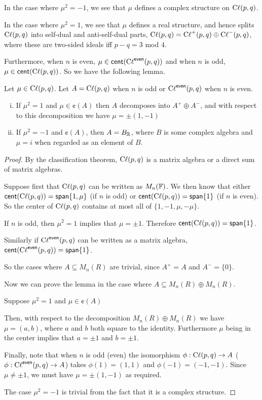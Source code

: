 In the case where $\mu^2=-1$, we see that $\mu$ defines a complex structure on $\operatorname{C\ell}(p,q)$.

In the case where $\mu^2 = 1$, we see that $\mu$ defines a real structure, and hence splits $\operatorname{C\ell}(p,q)$ into self-dual and anti-self-dual parts, $\operatorname{C\ell}(p,q) = \operatorname{C\ell}^+(p,q)\oplus \operatorname{C\ell}^-(p,q)$, where these are two-sided ideals iff $p-q=3$ mod $4$.

Furthermore, when $n$ is even, $\mu \in \operatorname{\textsf{cent}}(\operatorname{C\ell}^{\textsf{even}}(p,q))$ and when $n$ is odd, $\mu \in \operatorname{\textsf{cent}}(\operatorname{C\ell}(p,q))$. So we have the following lemma.

\begin{lemma}
Let $\mu \in \operatorname{C\ell}(p,q)$. Let $A = \operatorname{C\ell}(p,q)$ when $n$ is odd or $\operatorname{C\ell}^{\textsf{even}}(p,q)$ when $n$ is even.
\begin{enumerate}[(i)]
\item {
If $\mu^2 = 1$ and $\mu \in \cent(A)$ then $A$ decomposes into $A^+\oplus A^-$, and with respect to this decomposition we have $\mu = \pm(1,-1)$
}
\item {
If $\mu^2 = -1$ and $\cent(A)$, then $A = B_{\operatorname{\mathbb{R}}}$, where $B$ is some complex algebra and $\mu = i$ when regarded as an element of $B$.
}
\end{enumerate}
\end{lemma}
\begin{proof}
    By the classification theorem, $\operatorname{C\ell}(p,q)$ is a matrix algebra or a direct sum of matrix algebras.

    Suppose first that $\operatorname{C\ell}(p,q)$ can be written as $M_n(\operatorname{\mathbb{F}})$. We then know that either $\operatorname{\textsf{cent}}(\operatorname{C\ell}(p,q)) = \operatorname{\textsf{span}}\{1,\mu\}$ (if $n$ is odd) or $\operatorname{\textsf{cent}}(\operatorname{C\ell}(p,q)) = \operatorname{\textsf{span}}\{1\}$ (if $n$ is even). So the center of $\operatorname{C\ell}(p,q)$ contains at most all of $\{1,-1,\mu,-\mu\}$. 

    If $n$ is odd, then $\mu^2 = 1$ implies that $\mu =\pm 1$. Therefore $\operatorname{\textsf{cent}}(\operatorname{C\ell}(p,q)) = \operatorname{\textsf{span}}\{1\}$.

    Similarly if $\operatorname{C\ell}^{\textsf{even}}(p,q)$ can be written as a matrix algebra, $\operatorname{\textsf{cent}}(\operatorname{C\ell}^{\textsf{even}}(p,q)) = \operatorname{\textsf{span}}\{1\}$.

    So the cases where $A \subseteq M_n(R)$ are trivial, since $A^+=A$ and $A^-=\{0\}$.

    Now we can prove the lemma in the case where $A \subseteq M_n(R)\oplus M_n(R)$.

    Suppose $\mu^2 = 1$ and $\mu\in \cent(A)$
    
    Then, with respect to the decomposition $M_n(R)\oplus M_n(R)$ we have $\mu = (a,b)$, where $a$ and $b$ both square to the identity. Furthermore $\mu$ being in the center implies that $a=\pm 1$ and $b=\pm 1$. 

    Finally, note that when $n$ is odd (even) the isomorphism $\phi : \operatorname{C\ell}(p,q)\to A$ ($\phi : \operatorname{C\ell}^{\textsf{even}}(p,q)\to A$) takes $\phi(1) = (1,1)$ and $\phi(-1) = (-1,-1)$. Since $\mu \neq \pm 1$, we must have $\mu = \pm(1,-1)$ as required.

    The case $\mu^2=-1$ is trivial from the fact that it is a complex structure.
\end{proof}

